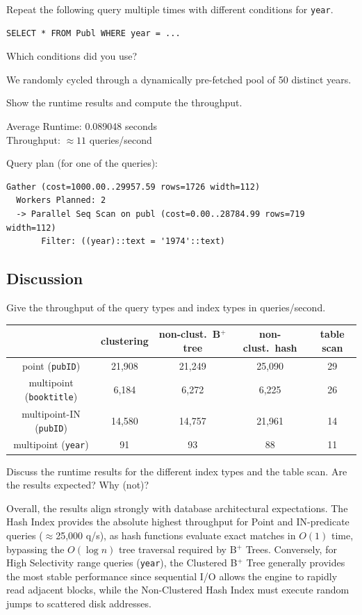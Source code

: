 \documentclass[11pt]{scrartcl}
\begin{document}
Repeat the following query multiple times with different conditions for \texttt{year}.

\begin{lstlisting}[style=dbtsql]
SELECT * FROM Publ WHERE year = ...
\end{lstlisting}

Which conditions did you use?

We randomly cycled through a dynamically pre-fetched pool of 50 distinct years.

Show the runtime results and compute the throughput.

Average Runtime: 0.089048 seconds \\
Throughput: $\approx 11$ queries/second

Query plan (for one of the queries):

{\small
\parskip0pt\begin{verbatim}
Gather (cost=1000.00..29957.59 rows=1726 width=112)
  Workers Planned: 2
  -> Parallel Seq Scan on publ (cost=0.00..28784.99 rows=719 width=112)
       Filter: ((year)::text = '1974'::text)
\end{verbatim}}

\subsection*{Discussion}

Give the throughput of the query types and index types in queries/second.
\begin{table}[H]
  \centering
  \begin{tabular}{c|c|c|c|c}
    & clustering & non-clust.\ B$^+$ tree & non-clust.\ hash & table scan
      \tabularnewline
    \hline
    point (\texttt{pubID}) & 21,908 & 21,249 & 25,090 & 29 \tabularnewline
    \hline
    multipoint (\texttt{booktitle}) & 6,184 & 6,272 & 6,225 & 26
      \tabularnewline
    \hline
    multipoint-IN (\texttt{pubID}) & 14,580 & 14,757 & 21,961 & 14
      \tabularnewline
    \hline
    multipoint (\texttt{year}) & 91 & 93 & 88 & 11
      \tabularnewline
  \end{tabular}
\end{table}

Discuss the runtime results for the different index types and the table scan. Are the results expected? Why (not)?

Overall, the results align strongly with database architectural expectations. The Hash Index provides the absolute highest throughput for Point and IN-predicate queries ($\approx$25,000 q/s), as hash functions evaluate exact matches in $O(1)$ time, bypassing the $O(\log n)$ tree traversal required by B$^+$ Trees. Conversely, for High Selectivity range queries (\texttt{year}), the Clustered B$^+$ Tree generally provides the most stable performance since sequential I/O allows the engine to rapidly read adjacent blocks, while the Non-Clustered Hash Index must execute random jumps to scattered disk addresses.
\end{document}
